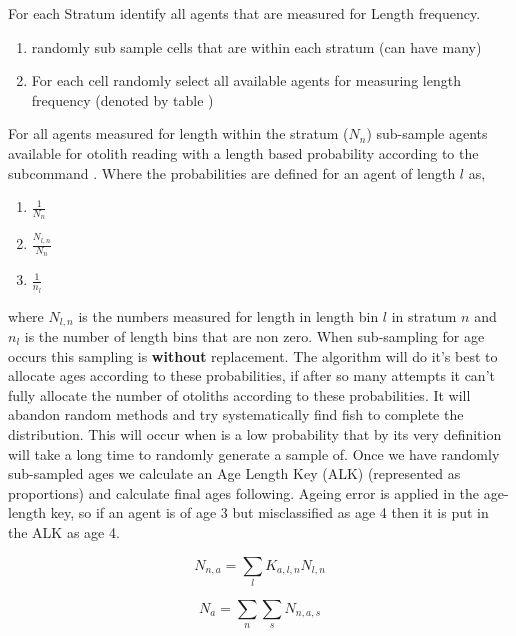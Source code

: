 For each Stratum identify all agents that are measured for Length frequency.
\begin{enumerate}
	\item randomly sub sample cells that are within each stratum (can have many) 
	\item For each cell randomly select all available agents for measuring length frequency (denoted by table )
\end{enumerate}
For all agents measured for length within the stratum ($N_n$) sub-sample agents available for otolith reading with a length based probability according to the subcommand . Where the probabilities are defined for an agent of length $l$ as,
\begin{enumerate}
		\item {} $\frac{1}{N_n}$
		\item {} $\frac{N_{l,n}}{N_n}$
		\item {} $\frac{1}{n_l}$
\end{enumerate}
where $N_{l,n}$ is the numbers measured for length in length bin $l$ in stratum $n$ and $n_l$ is the number of length bins that are non zero. When sub-sampling for age occurs this sampling is \textbf{without} replacement. The algorithm will do it's best to allocate ages according to these probabilities, if after so many attempts it can't fully allocate the number of otoliths according to these probabilities. It will abandon random methods and try systematically find fish to complete the distribution. This will occur when is a low probability that by its very definition will take a long time to randomly generate a sample of. Once we have randomly sub-sampled ages we calculate an Age Length Key (ALK) (represented as proportions) and calculate final ages following. Ageing error is applied in the age-length key, so if an agent is of age 3 but misclassified as age 4 then it is put in the ALK as age 4.

\begin{equation}
N_{n,a} = \sum_l K_{a,l,n} N_{l,n}
\end{equation}

\begin{equation}
N_{a} = \sum_n \sum_s N_{n,a,s}
\end{equation}


